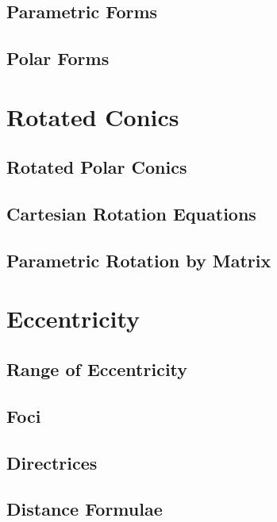 \subsection{Parametric Forms}
\subsection{Polar Forms}

\newpage
\section{Rotated Conics}
\subsection{Rotated Polar Conics}
\subsection{Cartesian Rotation Equations}
\subsection{Parametric Rotation by Matrix}

\newpage
\section{Eccentricity}
\subsection{Range of Eccentricity}
\subsection{Foci}
\subsection{Directrices}
\subsection{Distance Formulae}

\newpage
